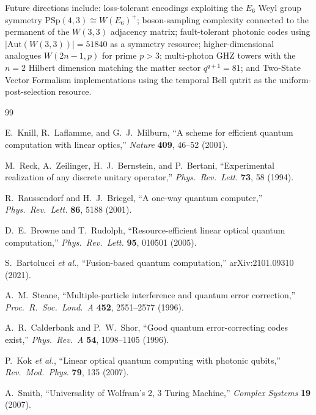 ﻿\documentclass[12pt]{article}
\newcommand{\PSp}{\mathrm{PSp}}
\newcommand{\Aut}{\mathrm{Aut}}
\begin{document}
Future directions include: loss-tolerant encodings exploiting the $E_6$ Weyl group
symmetry $\PSp(4,3) \cong W(E_6)^+$; boson-sampling complexity connected to the
permanent of the $W(3,3)$ adjacency matrix; fault-tolerant photonic codes using
$|\Aut(W(3,3))| = 51840$ as a symmetry resource; higher-dimensional analogues
$W(2n-1, p)$ for prime $p > 3$; multi-photon GHZ towers with the $n=2$ Hilbert
dimension matching the matter sector $q^{q+1} = 81$; and Two-State Vector
Formalism implementations using the temporal Bell qutrit as the uniform-
post-selection resource.

\begin{thebibliography}{99}

  E.~Knill, R.~Laflamme, and G.~J.~Milburn,
  ``A scheme for efficient quantum computation with linear optics,''
  \textit{Nature} \textbf{409}, 46--52 (2001).

  M.~Reck, A.~Zeilinger, H.~J.~Bernstein, and P.~Bertani,
  ``Experimental realization of any discrete unitary operator,''
  \textit{Phys.~Rev.~Lett.} \textbf{73}, 58 (1994).

  R.~Raussendorf and H.~J.~Briegel,
  ``A one-way quantum computer,''
  \textit{Phys.~Rev.~Lett.} \textbf{86}, 5188 (2001).

  D.~E.~Browne and T.~Rudolph,
  ``Resource-efficient linear optical quantum computation,''
  \textit{Phys.~Rev.~Lett.} \textbf{95}, 010501 (2005).

  S.~Bartolucci \textit{et al.},
  ``Fusion-based quantum computation,''
  arXiv:2101.09310 (2021).

  A.~M.~Steane,
  ``Multiple-particle interference and quantum error correction,''
  \textit{Proc.~R.~Soc.~Lond.~A} \textbf{452}, 2551--2577 (1996).

  A.~R.~Calderbank and P.~W.~Shor,
  ``Good quantum error-correcting codes exist,''
  \textit{Phys.~Rev.~A} \textbf{54}, 1098--1105 (1996).

  P.~Kok \textit{et al.},
  ``Linear optical quantum computing with photonic qubits,''
  \textit{Rev.~Mod.~Phys.} \textbf{79}, 135 (2007).

  A.~Smith,
  ``Universality of Wolfram's 2, 3 Turing Machine,''
  \textit{Complex Systems} \textbf{19} (2007).


\end{thebibliography}
\end{document}
